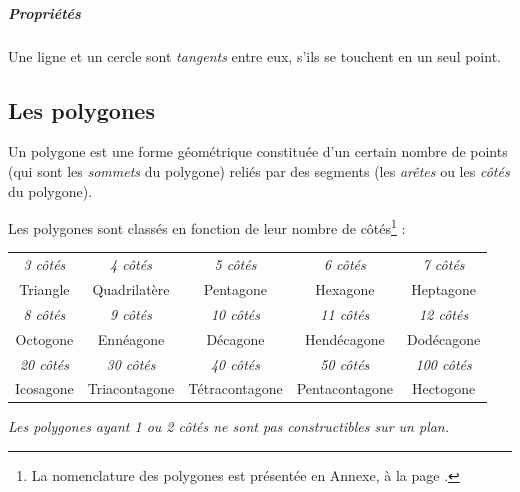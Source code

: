 \documentclass[a4paper, twoside]{article}
\begin{document}
\subparagraph*{Propriétés} Une ligne et un cercle sont \emph{tangents} entre eux,
s'ils se touchent en un seul point.

\newpage

\subsection{Les polygones} \label{polygones}

Un polygone est une forme géométrique constituée d'un certain nombre de points
(qui sont les \emph{sommets} du polygone) reliés par des segments (les \emph{arêtes}
ou les \emph{côtés} du polygone).

\medbreak

Les polygones sont classés en fonction de leur nombre de côtés\footnote{
	La nomenclature des polygones est présentée en Annexe, à la page \pageref{nomenclature_polygone_polyèdre}.
} :

\begin{center}
	\begin{tabular}{|c|c|c|c|c|}
		\hline
		\textit{3 côtés}                  & \textit{4 côtés}  & \textit{5 côtés}  & \textit{6 côtés}  & \textit{7 côtés}                    \\

		Triangle                          & Quadrilatère      & Pentagone         & Hexagone          & Heptagone                           \\
		\hline
		\hline
		\textit{8 côtés}                  & \textit{9 côtés}  & \textit{10 côtés} & \textit{11 côtés} & \textit{12 côtés}                   \\

		Octogone                          & Ennéagone         & Décagone          & Hendécagone       & Dodécagone                          \\
		\hline
		\hline
		\textit{20 côtés}                 & \textit{30 côtés} & \textit{40 côtés} & \textit{50 côtés} & \textit{100 côtés}                  \\

		\phantom{cc}Icosagone\phantom{cc} & Triacontagone     & Tétracontagone    & Pentacontagone    & \phantom{cc} Hectogone \phantom{cc} \\
		\hline
	\end{tabular}
	\medbreak

	\textit{Les polygones ayant 1 ou 2 côtés ne sont pas constructibles sur un plan.}

\end{center}
\end{document}
